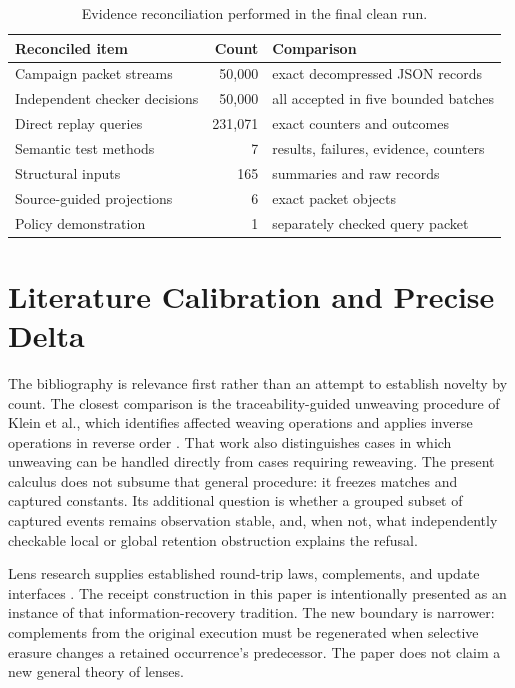 \begin{table}[t]
\caption{Evidence reconciliation performed in the final clean run.}
\label{tab:reconcile}
\small
\begin{tabularx}{\textwidth}{@{}X r l@{}}
\toprule
Reconciled item & Count & Comparison \\
\midrule
Campaign packet streams & 50,000 & exact decompressed JSON records \\
Independent checker decisions & 50,000 & all accepted in five bounded batches \\
Direct replay queries & 231,071 & exact counters and outcomes \\
Semantic test methods & 7 & results, failures, evidence, counters \\
Structural inputs & 165 & summaries and raw records \\
Source-guided projections & 6 & exact packet objects \\
Policy demonstration & 1 & separately checked query packet \\
\bottomrule
\end{tabularx}
\end{table}

\section{Literature Calibration and Precise Delta}
\label{app:calibration}

The bibliography is relevance first rather than an attempt to establish novelty by
count.  The closest comparison is the traceability-guided unweaving procedure of
Klein et al., which identifies affected weaving operations and applies inverse
operations in reverse order \cite{Klein2009}.  That work also distinguishes cases in
which unweaving can be handled directly from cases requiring reweaving.  The present
calculus does not subsume that general procedure: it freezes matches and captured
constants.  Its additional question is whether a grouped subset of captured events
remains observation stable, and, when not, what independently checkable local or
global retention obstruction explains the refusal.

Lens research supplies established round-trip laws, complements, and update
interfaces \cite{Foster2007,Bohannon2006,Hofmann2011,Stevens2008,Czarnecki2009,
Voigtlaender2009,Matsuda2007,Diskin2011,Pacheco2014}.  The receipt construction in
this paper is intentionally presented as an instance of that information-recovery
tradition.  The new boundary is narrower: complements from the original execution
must be regenerated when selective erasure changes a retained occurrence's
predecessor.  The paper does not claim a new general theory of lenses.

